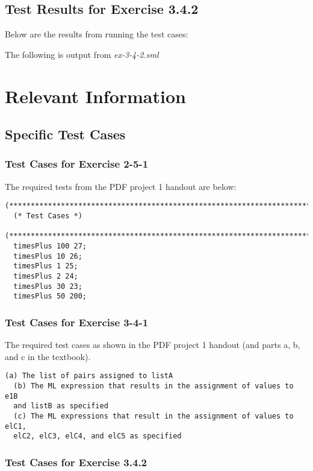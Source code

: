 \documentclass{report}
\begin{document}
\section{Test Results for Exercise 3.4.2}
\label{sec:tests-ex-3-4-2}

Below are the results from running the test cases:

The following is output from \emph{ex-3-4-2.sml}


\chapter{Relevant Information}
\label{cha:relevant-information}

\section{Specific Test Cases}
\label{sec:specific-test-cases}

\subsection{Test Cases for Exercise 2-5-1}
\label{sec:test-cases-ex-2-5-1}
The required tests from the PDF project 1 handout are below:
\begin{lstlisting}[frame=TB]
  (******************************************************************************) 
  (* Test Cases *) 
  (******************************************************************************) 
  timesPlus 100 27;
  timesPlus 10 26; 
  timesPlus 1 25; 
  timesPlus 2 24; 
  timesPlus 30 23; 
  timesPlus 50 200;
 \end{lstlisting}

\subsection{Test Cases for Exercise 3-4-1}
\label{sec:test-cases-ex-3-4-1}
The required test cases as shown in the PDF project 1 handout (and
parts a, b, and c in the textbook).
\begin{lstlisting}[frame=TB]
  (a) The list of pairs assigned to listA
  (b) The ML expression that results in the assignment of values to e1B 
  and listB as specified
  (c) The ML expressions that result in the assignment of values to elC1,
  elC2, elC3, elC4, and elC5 as specified
\end{lstlisting}

\subsection{Test Cases for Exercise 3.4.2}
\label{sec:test-cases-ex-3-4-2}
\end{document}
